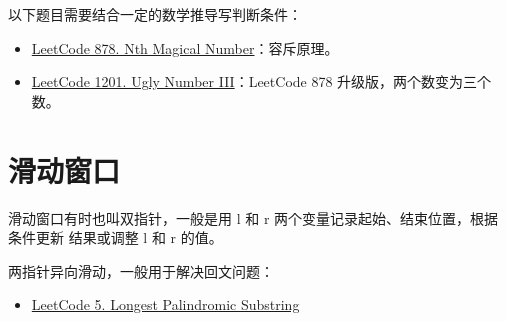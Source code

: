 以下题目需要结合一定的数学推导写判断条件：

\begin{itemize}
  \label{lc:bs-range-math}
  \item
    \href{https://leetcode.com/problems/nth-magical-number/}{LeetCode 878. Nth
      Magical Number}：容斥原理。
  \item
    \href{https://leetcode.com/problems/ugly-number-iii/}{LeetCode 1201. Ugly
      Number III}：LeetCode 878 升级版，两个数变为三个数。

\end{itemize}

\section{滑动窗口}

滑动窗口有时也叫双指针，一般是用 l 和 r 两个变量记录起始、结束位置，根据条件更新
结果或调整 l 和 r 的值。

两指针异向滑动，一般用于解决回文问题：
\begin{itemize}
  \item
    \href{https://leetcode.com/problems/longest-palindromic-substring/}{LeetCode
    5. Longest Palindromic Substring}
\end{itemize}

